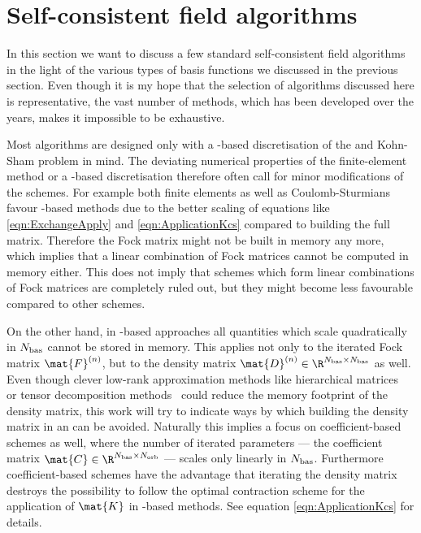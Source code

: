 \section{Self-consistent field algorithms}
\label{sec:SCFAlgorithms}

In this section we want to discuss a few standard self-consistent field algorithms
in the light of the various types of basis functions we discussed in the previous section.
Even though it is my hope that the selection of algorithms discussed here
is representative,
the vast number of methods,
which has been developed over the years,
makes it impossible to be exhaustive.

Most \SCF algorithms are designed only with a \cGTO-based
discretisation of the \HF and Kohn-Sham \DFT problem in mind.
The deviating numerical properties of the finite-element method
or a \CS-based discretisation
therefore often call for minor modifications of the schemes.
For example both finite elements as well as Coulomb-Sturmians
favour \contraction-based methods
due to the better scaling of equations like \eqref{eqn:ExchangeApply}
and \eqref{eqn:ApplicationKcs}
compared to building the full matrix.
Therefore the Fock matrix might not be built in memory any more,
which implies that a linear combination of Fock matrices
cannot be computed in memory either.
This does not imply that \SCF schemes
which form linear combinations of Fock matrices
are completely ruled out,
but they might become less favourable compared to other schemes.

On the other hand, in \FE-based approaches all quantities
which scale quadratically in $N_\text{bas}$ cannot be stored in memory.
This applies not only to the iterated Fock matrix $\mat{F}^{(n)}$,
but to the density matrix $\mat{D}^{(n)} \in \R^{\Nbas\times \Nbas}$ as well.
Even though clever low-rank approximation methods
like hierarchical matrices~\cite{Hackbusch1999,Hackbusch2002,Grasedyck2003,Hackbusch2015}
or tensor decomposition methods~\cite{Kolda2009,Oseledets2011,%
Schollwoeck2011,Khoromskaia2015}
could reduce the memory footprint of the density matrix,
this work will try to indicate ways
by which building the density matrix in an \SCF can be avoided.
Naturally this implies
a focus on coefficient-based \SCF schemes as well,
where the number of iterated parameters
--- the coefficient matrix $\mat{C} \in \R^{\Nbas\times\Norb}$ ---
scales only linearly in $N_\text{bas}$.
Furthermore coefficient-based \SCF schemes have the advantage
that iterating the density matrix
destroys the possibility to follow the optimal contraction scheme
for the application of $\mat{K}$ in \CS-based methods.
See equation \eqref{eqn:ApplicationKcs} for details.

